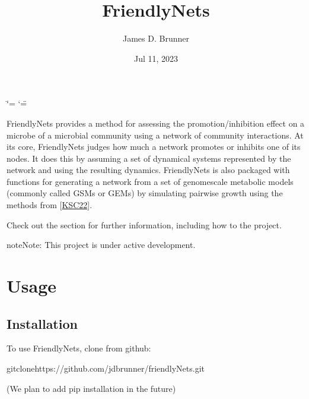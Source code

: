 \documentclass[letterpaper,10pt,english]{sphinxmanual}
\title{FriendlyNets}
\date{Jul 11, 2023}
\author{James D.\@{} Brunner}
\begin{document}
\ifdefined\shorthandoff
  \ifnum\catcode`\=\string=\active\shorthandoff{=}\fi
  \ifnum\catcode`\"=\active{}\fi
\fi

\pagestyle{empty}
\sphinxmaketitle
\pagestyle{plain}
\sphinxtableofcontents
\pagestyle{normal}
\label{\detokenize{index::doc}}


\sphinxAtStartPar
FriendlyNets provides a method for assessing the promotion/inhibition effect on a microbe of a microbial community using a network of community interactions. At its core, FriendlyNets judges how much a network
promotes or inhibits one of its nodes. It does this by assuming a set of dynamical systems represented by the network and using the resulting dynamics. FriendlyNets is also packaged with functions for generating
a network from a set of genome\sphinxhyphen{}scale metabolic models (commonly called GSMs or GEMs) by simulating pairwise growth using the methods from {[}\hyperlink{cite.index:id3}{KSC22}{]}.

\sphinxAtStartPar
Check out the {\hyperref[\detokenize{usage::doc}]{}} section for further information, including how to
{\hyperref[\detokenize{usage:installation}]{}} the project.

\begin{sphinxadmonition}{note}{Note:}
\sphinxAtStartPar
This project is under active development.
\end{sphinxadmonition}

\sphinxstepscope


\chapter{Usage}
\label{\detokenize{usage:usage}}\label{\detokenize{usage::doc}}

\section{Installation}
\label{\detokenize{usage:installation}}\label{\detokenize{usage:id1}}
\sphinxAtStartPar
To use FriendlyNets, clone from github:

\begin{sphinxVerbatim}[commandchars=\\\{\}]
gitclonehttps://github.com/jdbrunner/friendlyNets.git
\end{sphinxVerbatim}

\sphinxAtStartPar
(We plan to add pip installation in the future)
\end{document}
